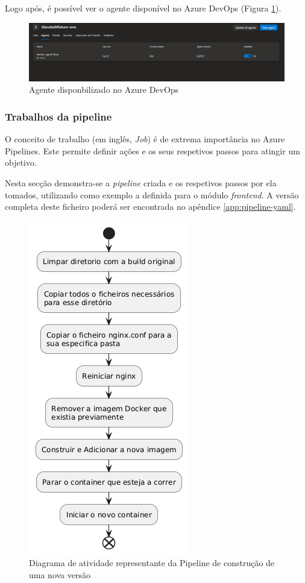 Logo após, é possível ver o agente disponível no Azure DevOps (Figura \ref{fig:agent-devops}). 

\begin{figure}[h!tbp]
\includegraphics[width=\linewidth]{capitulos/cap4-implementacao/assets/devops-agent.png}
\caption{Agente disponbilizado no Azure DevOps}
\label{fig:agent-devops}
\end{figure}

\subsubsection{Trabalhos da pipeline}

O conceito de trabalho (em inglês, \textit{Job}) é de extrema importância no Azure Pipelines. Este permite definir ações e os seus respetivos passos para atingir um objetivo.

Nesta secção demonstra-se a \textit{pipeline} criada e os respetivos passos por ela tomados, utilizando como exemplo a definida para o módulo \textit{frontend}. A versão completa deste ficheiro poderá ser encontrada no apêndice \ref{app:pipeline-yaml}. 

\begin{figure}[h!tbp]
    \centering
    \includegraphics[width=0.3\linewidth]{capitulos/cap4-implementacao/assets/pipeline-activity-diagram.png}
    \caption{Diagrama de atividade representante da Pipeline de construção de uma nova versão}
    \label{fig:pipeline-ad}
\end{figure}


